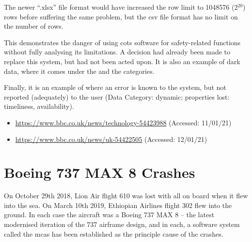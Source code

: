 The newer ``.xlsx'' file format would have increased the row limit to 1048576 (2$^{20}$) rows before suffering the same problem, but the \gls{csv} file format has no limit on the number of rows.

This demonstrates the danger of using \gls{cots} software for safety-related functions without fully analysing its limitations. A decision had already been made to replace this system, but had not been acted upon. It is also an example of dark data, where it comes under the
 and the  categories.

Finally, it is an example of where an error is known to the system, but not reported (adequately) to the user (Data Category: dynamic; properties lost: \gls{timeliness}, \gls{availability}).

\begin{itemize}
  \item\href{https://www.bbc.co.uk/news/technology-54423988}{https://www.bbc.co.uk/news/technology-54423988} (Accessed: 11/01/21)
  \item\href{https://www.bbc.co.uk/news/uk-54422505}{https://www.bbc.co.uk/news/uk-54422505} (Accessed: 12/01/21)
\end{itemize}

\section{Boeing 737 MAX 8 Crashes} \label{bkm:incacc:737max8}

On October 29th 2018, Lion Air flight 610 was lost with all on board when it flew into the sea. On March 10th 2019, Ethiopian Airlines flight 302 flew into the ground. In each case the aircraft was a Boeing 737 MAX 8 -- the latest modernised iteration of the 737 airframe design, and in each, a software system called the \gls{mcas} has been established as the principle cause of the crashes.

